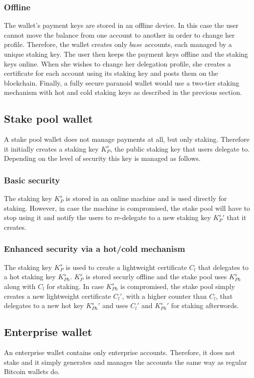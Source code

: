 \subsubsection{Offline}

The wallet's payment keys are stored in an offline device. In this case the user cannot move the balance from one account to another in order to change her profile. Therefore, the wallet creates only $base$ accounts, each managed by a unique staking key. The user then keeps the payment keys offline and the staking keys online. When she wishes to change her delegation profile, she creates a certificate for each account using its staking key and posts them on the blockchain. Finally, a fully secure paranoid wallet would use a two-tier staking mechanism with hot and cold staking keys as described in the previous section.

\subsection{Stake pool wallet}

A stake pool wallet does not manage payments at all, but only staking. Therefore it initially creates a staking key $K^s_P$, the public staking key that users delegate to. Depending on the level of security this key is managed as follows.

\subsubsection{Basic security}

The staking key $K^s_P$ is stored in an online machine and is used directly for staking. However, in case the machine is compromised, the stake pool will have to stop using it and notify the users to re-delegate to a new staking key ${K^s_P}'$ that it creates.

\subsubsection{Enhanced security via a hot/cold mechanism}

The staking key $K^s_P$ is used to create a lightweight certificate $C_l$ that delegates to a hot staking key $K^s_{Ph}$. $K^s_P$ is stored securly offline and the stake pool uses $K^s_{Ph}$ along with $C_l$ for staking. In case $K^s_{Ph}$ is compromised, the stake pool simply creates a new lightweight certificate ${C_l}'$, with a higher counter than $C_l$, that delegates to a new hot key ${K^s_{Ph}}'$ and uses ${C_l}'$ and ${K^s_{Ph}}'$ for staking afterwords.

\subsection{Enterprise wallet}

An enterprise wallet contains only enterprise accounts. Therefore, it does not stake and it simply generates and manages the accounts the same way as regular Bitcoin wallets do.
